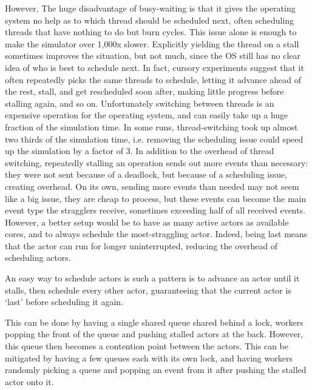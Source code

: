 However, The huge disadvantage of busy-waiting is that it gives the operating system no help as to which thread should be scheduled next, often scheduling threads that have nothing to do but burn cycles.
This issue alone is enough to make the simulator over 1,000x slower.
Explicitly yielding the thread on a stall sometimes improves the situation, but not much, since the OS still has no clear idea of who is best to schedule next.
In fact, cursory experiments suggest that it often repeatedly picks the same threads to schedule, letting it advance ahead of the rest, stall, and get rescheduled soon after, making little progress before stalling again, and so on.
Unfortunately switching between threads is an expensive operation for the operating system, and can easily take up a huge fraction of the simulation time.
In some runs, thread-switching took up almost two thirds of the simulation time, i.e. removing the scheduling issue could speed up the simulation by a factor of 3.
In addition to the overhead of thread switching, repeatedly stalling an operation sends out more  events than necessary: they were not sent because of a deadlock, but because of a scheduling issue, creating overhead.
On its own, sending more events than needed may not seem like a big issue, they are cheap to process, but these  events can become the main event type the stragglers receive, sometimes exceeding half of all received events.
\\


However, a better setup would be to have as many active actors as available cores, and to always schedule the most-straggling actor.
Indeed, being last means that the actor can run for longer uninterrupted, reducing the overhead of scheduling actors.

An easy way to schedule actors is such a pattern is to advance an actor until it stalls, then schedule every other actor, guaranteeing that the current actor is `last' before scheduling it again.

This can be done by having a single shared queue shared behind a lock, workers popping the front of the queue and pushing stalled actors at the back.
However, this queue then becomes a contention point between the actors.
This can be mitigated by having a few queues each with its own lock, and having workers randomly picking a queue and popping an event from it after pushing the stalled actor onto it.

